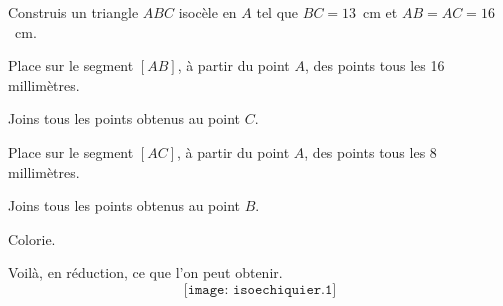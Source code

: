 \begin{myenumerate}
\item Construis un triangle $ABC$ isocèle en $A$ tel que $BC=13$~cm et $AB=AC=16$~cm.
\item Place sur le segment $[AB]$, à partir du point $A$, des points tous les 16 millimètres.
\item Joins tous les points obtenus au point $C$.
\item Place sur le segment $[AC]$, à partir du point $A$, des points tous les 8 millimètres.
\item Joins tous les points obtenus au point $B$.
\item Colorie.
\end{myenumerate}
Voilà, en réduction, ce que l'on peut obtenir.
\[\texttt{[image: isoechiquier.1]}\]
